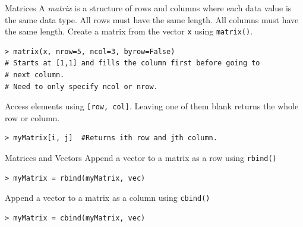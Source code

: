 \documentclass[xcolor=svgnames, 10pt, handout]{beamer}
\begin{document}
\begin{frame}[fragile]{Matrices}
A \emph{matrix} is a structure of rows and columns where each data value is the same data type.  All rows must have the same length.  All columns must have the same length.
\vfill
Create a matrix from the vector \texttt{x} using \texttt{matrix()}.
\begin{Verbatim}[commandchars=\\\{\}, xleftmargin=2em]
> matrix(x, nrow=5, ncol=3, byrow=False)
# Starts at [1,1] and fills the column first before going to
# next column.
# Need to only specify ncol or nrow.
\end{Verbatim}
\vfill
Access elements using \texttt{[row, col]}.  Leaving one of them blank returns the whole row or column.
\begin{Verbatim}[commandchars=\\\{\}, xleftmargin=2em]
> myMatrix[i, j]  #Returns ith row and jth column.
\end{Verbatim}
\end{frame}


\begin{frame}[fragile]{Matrices and Vectors}
\vfill
Append a vector to a matrix as a row using \texttt{rbind()}
\begin{Verbatim}[commandchars=\\\{\}, xleftmargin=2em]
> myMatrix = rbind(myMatrix, vec)
\end{Verbatim}
\vfill
Append a vector to a matrix as a column using \texttt{cbind()}
\begin{Verbatim}[commandchars=\\\{\}, xleftmargin=2em]
> myMatrix = cbind(myMatrix, vec)
\end{Verbatim}
\vfill
\end{frame}
\end{document}

